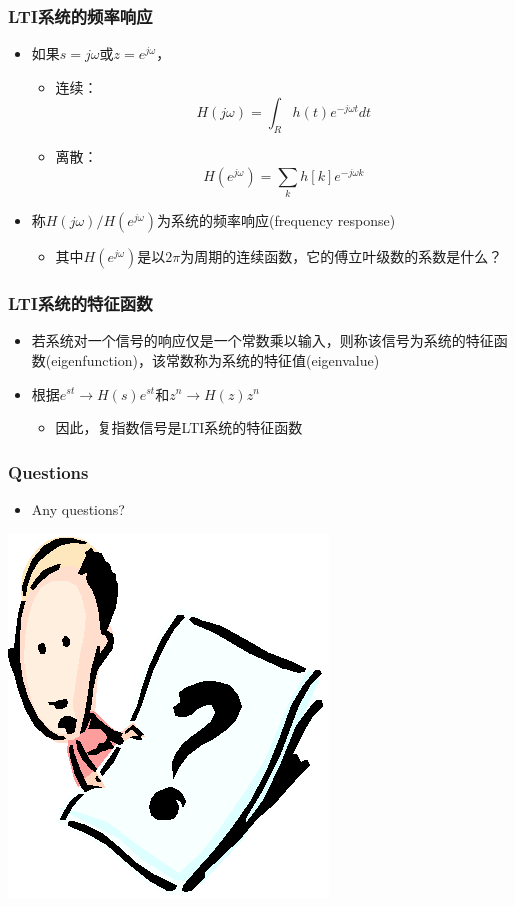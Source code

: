 \documentclass[CJKutf8,xcolor=pdftex,dvipsnames,table]{beamer}
\begin{document}
\begin{CJK*}{UTF8}{song}
  \begin{frame}
    \frametitle{LTI系统的频率响应}
    \begin{itemize}
    \item 如果$s=j\omega$或$z=e^{j\omega}$，
		\begin{itemize}
		\item 连续：\[ H(j\omega) = \int_R h(t)e^{-j\omega t} dt \]
		\item 离散：\[ H(e^{j\omega}) = \sum_k h[k]e^{-j\omega k}\]
		\end{itemize}
	\item 称$H(j\omega)/H(e^{j\omega})$为系统的频率响应(frequency response)
		\begin{itemize}
		\item 其中$H(e^{j\omega})$是以$2\pi$为周期的连续函数，它的傅立叶级数的系数是什么？
		\end{itemize}
    \end{itemize}
  \end{frame} 
            
  \begin{frame}
    \frametitle{LTI系统的特征函数}
    \begin{itemize}
    \item 若系统对一个信号的响应仅是一个常数乘以输入，则称该信号为系统的特征函数(eigenfunction)，该常数称为系统的特征值(eigenvalue)
    \item 根据$e^{st} \rightarrow H(s)e^{st}$和$z^{n} \rightarrow H(z)z^{n}$
	    \begin{itemize}
		\item 因此，复指数信号是LTI系统的特征函数
		\end{itemize}
    \end{itemize}
  \end{frame}           
              
  \begin{frame}
    \frametitle{Questions}
    \begin{itemize}
    \item Any questions?
    \end{itemize}
    \begin{center}
      \includegraphics[scale=.5]{question}
    \end{center}
  \end{frame}     
  

\end{CJK*}
\end{document}

